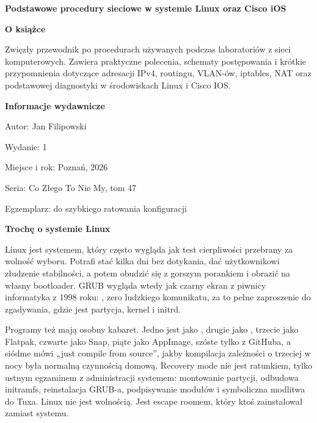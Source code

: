 \documentclass[10pt,a5paper,twoside]{article}
\newcommand{\code}[1]{\texttt{\detokenize{#1}}}
\begin{document}
\clearpage
\thispagestyle{empty}
\pagecolor{CoverYellow}
\color{black}
\fontsize{8.7}{9.8}\selectfont
\vspace*{4mm}

{\bfseries Podstawowe procedury sieciowe w systemie Linux oraz Cisco iOS\par}

\vspace{8mm}

\noindent\textbf{O książce}\par
\noindent Zwięzły przewodnik po procedurach używanych podczas laboratoriów z sieci komputerowych. Zawiera praktyczne polecenia, schematy postępowania i krótkie przypomnienia dotyczące adresacji IPv4, routingu, VLAN-ów, iptables, NAT oraz podstawowej diagnostyki w środowiskach Linux i Cisco IOS.

\vspace{4mm}
\noindent\textbf{Informacje wydawnicze}\par
\noindent Autor: Jan Filipowski\par
\noindent Wydanie: 1\par
\noindent Miejsce i rok: Poznań, 2026\par
\noindent Seria: Co Złego To Nie My, tom 47\par
\noindent Egzemplarz: do szybkiego ratowania konfiguracji

\vspace{5mm}

\noindent\textbf{Trochę o systemie Linux}\par
\noindent Linux jest systemem, który często wygląda jak test cierpliwości przebrany za wolność wyboru. Potrafi stać kilka dni bez dotykania, dać użytkownikowi złudzenie stabilności, a potem obudzić się z gorszym porankiem i obrazić na własny bootloader. GRUB wygląda wtedy jak czarny ekran z piwnicy informatyka z 1998 roku: \code{grub rescue>}, zero ludzkiego komunikatu, za to pełne zaproszenie do zgadywania, gdzie jest partycja, kernel i initrd.

\noindent Programy też mają osobny kabaret. Jedno jest jako \code{.deb}, drugie jako \code{.rpm}, trzecie jako Flatpak, czwarte jako Snap, piąte jako AppImage, szóste tylko z GitHuba, a siódme mówi „just compile from source”, jakby kompilacja zależności o trzeciej w nocy była normalną czynnością domową. Recovery mode nie jest ratunkiem, tylko ustnym egzaminem z administracji systemem: montowanie partycji, odbudowa initramfs, reinstalacja GRUB-a, podpisywanie modułów i symboliczna modlitwa do Tuxa. Linux nie jest wolnością. Jest escape roomem, który ktoś zainstalował zamiast systemu.
\end{document}
